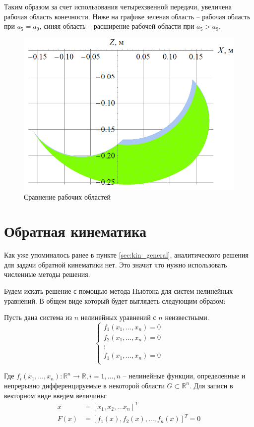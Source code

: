Таким образом за счет использования четырехзвенной передачи, увеличена рабочая область конечности. Ниже на графике зеленая область -- рабочая область при $ a_5 = a_9 $, синяя область -- расширение рабочей области при $ a_5 > a_9 $.
\begin{figure}[h]
    \centering
    \includegraphics[scale=0.8]{chapter_kinematics/figure7.png}
    \caption{Сравнение рабочих областей}
    \label{}
\end{figure}

\section{Обратная кинематика} \label{sec:inverse_kin}
Как уже упоминалось ранее в пункте \ref{sec:kin_general}, аналитического решения для задачи обратной кинематики нет. Это значит что нужно использовать численные методы решения.

Будем искать решение с помощью метода Ньютона для систем нелинейных уравнений. В общем виде который будет выглядеть следующим образом:

Пусть дана система из $ n $ нелинейных уравнений с $ n $ неизвестными.
\[
\left\{ 
\begin{array}{c}
    f_1(x_1, \dots, x_n) = 0 \\
    f_2(x_1, \dots, x_n) = 0 \\
    \vdots \\
    f_1(x_1, \dots, x_n) = 0 \\
\end{array} 
\right.
\]

\noindent Где $ f_i(x_1,\dots,x_n): \mathbb{R}^n \rightarrow \mathbb{R}, i=1,\dots, n $ -- нелинейные функции, определенные и непрерывно дифференцируемые в некоторой области $ G \subset \mathbb{R}^n $. Для записи в векторном виде введем величины:
\begin{align*}
    \overline{x} &= [x_1, x_2, \dots x_n]^T \\
    F(x) &= [f_1(x), f_2(x),\dots,f_n(x)]^T = 0
\end{align*}

